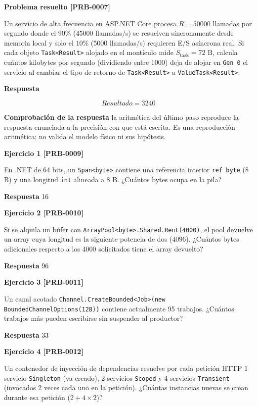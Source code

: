 \documentclass{book}
\begin{document}
\noindent\textbf{Problema resuelto [PRB-0007]}

Un servicio de alta frecuencia en ASP.NET Core procesa \(R = 50000\) llamadas por segundo donde el \(90\%\) (\(45000\) llamadas/s) se resuelven síncronamente desde memoria local y solo el \(10\%\) (\(5000\) llamadas/s) requieren E/S asíncrona real. Si cada objeto \texttt{Task<Result>} alojado en el montículo mide \(S_{\text{task}} = 72\text{ B}\), calcula cuántos kilobytes por segundo (dividiendo entre 1000) deja de alojar en \texttt{Gen 0} el servicio al cambiar el tipo de retorno de \texttt{Task<Result>} a \texttt{ValueTask<Result>}.

\noindent\textbf{Respuesta}

\[
Resultado = 3240
\]

\noindent\textbf{Comprobación de la respuesta} la aritmética del último paso reproduce la respuesta enunciada a la precisión con que está escrita. Es una reproducción aritmética; no valida el modelo físico ni sus hipótesis.

\noindent\textbf{Ejercicio 1 [PRB-0009]}

En .NET de 64 bits, un \texttt{Span<byte>} contiene una referencia interior \texttt{ref byte} (8 B) y una longitud \texttt{int} alineada a 8 B. ¿Cuántos bytes ocupa en la pila?

\noindent\textbf{Respuesta} 16

\noindent\textbf{Ejercicio 2 [PRB-0010]}

Si se alquila un búfer con \texttt{ArrayPool<byte>.Shared.Rent(4000)}, el pool devuelve un array cuya longitud es la siguiente potencia de dos (\(4096\)). ¿Cuántos bytes adicionales respecto a los 4000 solicitados tiene el array devuelto?

\noindent\textbf{Respuesta} 96

\noindent\textbf{Ejercicio 3 [PRB-0011]}

Un canal acotado \texttt{Channel.CreateBounded<Job>(new BoundedChannelOptions(128))} contiene actualmente 95 trabajos. ¿Cuántos trabajos más pueden escribirse sin suspender al productor?

\noindent\textbf{Respuesta} 33

\noindent\textbf{Ejercicio 4 [PRB-0012]}

Un contenedor de inyección de dependencias resuelve por cada petición HTTP 1 servicio \texttt{Singleton} (ya creado), 2 servicios \texttt{Scoped} y 4 servicios \texttt{Transient} (invocados 2 veces cada uno en la petición). ¿Cuántas instancias nuevas se crean durante esa petición (\(2 + 4 \times 2\))?
\end{document}
